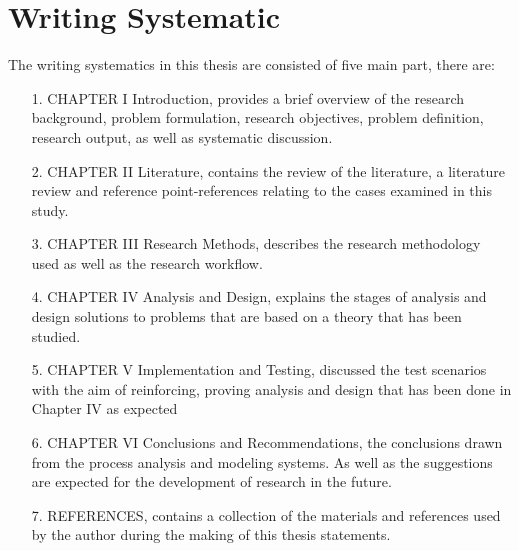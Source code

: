 \section{Writing Systematic}
The writing systematics in this thesis are consisted of five main part, there are:
\begin{enumerate}
\setlength{\itemsep}{1.5pt}
\setlength{\parskip}{1.5pt}
\item[1.] CHAPTER I Introduction, provides a brief overview of the research background, problem formulation, research objectives, problem definition, research output, as well as systematic discussion.
\item[2.] CHAPTER II Literature, contains the review of the literature, a literature review and reference point-references relating to the cases examined in this study.
\item[3.] CHAPTER III Research Methods, describes the research methodology used as well as the research workflow.
\item[4.] CHAPTER IV Analysis and Design, explains the stages of analysis and design solutions to problems that are based on a theory that has been studied.
\item[5.] CHAPTER V Implementation and Testing, discussed the test scenarios with the aim of reinforcing, proving analysis and design that has been done in Chapter IV as expected
\item[6.] CHAPTER VI Conclusions and Recommendations, the conclusions drawn from the process analysis and modeling systems. As well as the suggestions are expected for the development of research in the future.
\item [7.] REFERENCES, contains a collection of the materials and references used by the author during the making of this thesis statements.
\end{enumerate}
